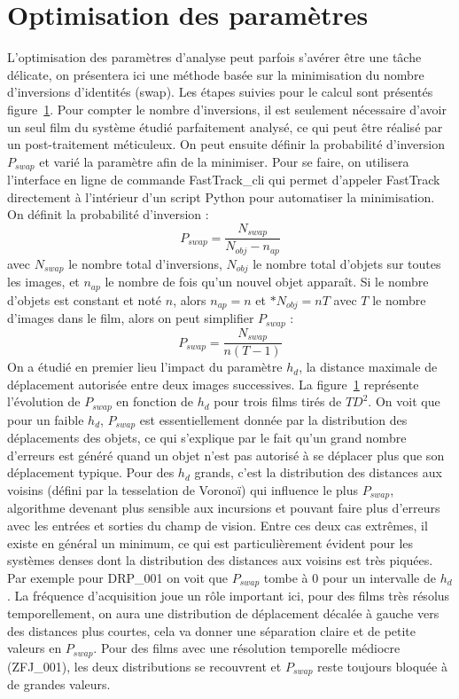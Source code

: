 	\section{Optimisation des paramètres}
	
	L'optimisation des paramètres d'analyse peut parfois s'avérer être une tâche délicate, on présentera ici une méthode basée sur la minimisation du nombre d'inversions d'identités (swap). Les étapes suivies pour le calcul sont présentés figure~\ref{}. Pour compter le nombre d'inversions, il est seulement nécessaire d'avoir un seul film du système étudié parfaitement analysé, ce qui peut être réalisé par un post-traitement méticuleux. On peut ensuite définir la probabilité d'inversion $P_{swap}$ et varié la paramètre afin de la minimiser. Pour se faire, on utilisera l'interface en ligne de commande FastTrack\_cli qui permet d'appeler FastTrack directement à l'intérieur d'un script Python pour automatiser la minimisation. On définit la probabilité d'inversion :
	$$
	    P_{swap}=\frac{N_{swap}}{N_{obj}-n_{ap}}
	$$
	avec $N_{swap}$ le nombre total d'inversions, $N_{obj}$ le nombre total d'objets sur toutes les images, et $n_{ap}$ le nombre de fois qu'un nouvel objet apparaît. Si le nombre d'objets est constant et noté $n$, alors $n_{ap}=n$ et $*N_{obj}=nT$ avec $T$ le nombre d'images dans le film, alors on peut simplifier $P_{swap}$ :
    $$
	    P_{swap}=\frac{N_{swap}}{n(T-1)}
	$$
	On a étudié en premier lieu l'impact du paramètre $h_d$, la distance maximale de déplacement autorisée entre deux images successives. La figure~\ref{} représente l'évolution de $P_{swap}$ en fonction de $h_d$ pour trois films tirés de $TD^2$. On voit que pour un faible $h_d$, $P_{swap}$ est essentiellement donnée par la distribution des déplacements des objets, ce qui s'explique par le fait qu'un grand nombre d'erreurs est généré quand un objet n'est pas autorisé à se déplacer plus que son déplacement typique. Pour des $h_d$ grands, c'est la distribution des distances aux voisins (défini par la tesselation de Voronoï) qui influence le plus $P_{swap}$, algorithme devenant plus sensible aux incursions et pouvant faire plus d'erreurs avec les entrées et sorties du champ de vision.
	Entre ces deux cas extrêmes, il existe en général un minimum, ce qui est particulièrement évident pour les systèmes denses dont la distribution des distances aux voisins est très piquées. Par exemple pour DRP\_001 on voit que $P_{swap}$ tombe à 0 pour un intervalle de $h_d$. La fréquence d'acquisition joue un rôle important ici, pour des films très résolus temporellement, on aura une distribution de déplacement décalée à gauche vers des distances plus courtes, cela va donner une séparation claire et de petite valeurs en $P_{swap}$. Pour des films avec une résolution temporelle médiocre (ZFJ\_001), les deux distributions se recouvrent et $P_{swap}$ reste toujours bloquée à de grandes valeurs.

